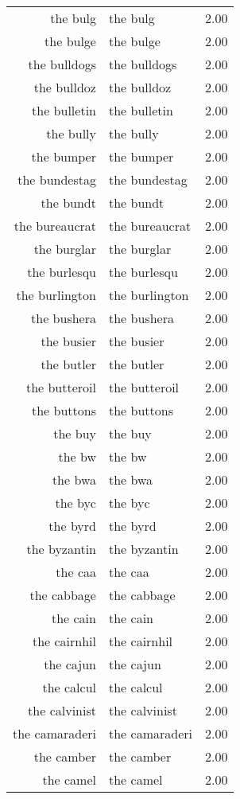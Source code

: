 \begin{table}[ht]
\begin{tabular}{rlr}
  the bulg & the bulg & 2.00 \\ 
  the bulge & the bulge & 2.00 \\ 
  the bulldogs & the bulldogs & 2.00 \\ 
  the bulldoz & the bulldoz & 2.00 \\ 
  the bulletin & the bulletin & 2.00 \\ 
  the bully & the bully & 2.00 \\ 
  the bumper & the bumper & 2.00 \\ 
  the bundestag & the bundestag & 2.00 \\ 
  the bundt & the bundt & 2.00 \\ 
  the bureaucrat & the bureaucrat & 2.00 \\ 
  the burglar & the burglar & 2.00 \\ 
  the burlesqu & the burlesqu & 2.00 \\ 
  the burlington & the burlington & 2.00 \\ 
  the bushera & the bushera & 2.00 \\ 
  the busier & the busier & 2.00 \\ 
  the butler & the butler & 2.00 \\ 
  the butteroil & the butteroil & 2.00 \\ 
  the buttons & the buttons & 2.00 \\ 
  the buy & the buy & 2.00 \\ 
  the bw & the bw & 2.00 \\ 
  the bwa & the bwa & 2.00 \\ 
  the byc & the byc & 2.00 \\ 
  the byrd & the byrd & 2.00 \\ 
  the byzantin & the byzantin & 2.00 \\ 
  the caa & the caa & 2.00 \\ 
  the cabbage & the cabbage & 2.00 \\ 
  the cain & the cain & 2.00 \\ 
  the cairnhil & the cairnhil & 2.00 \\ 
  the cajun & the cajun & 2.00 \\ 
  the calcul & the calcul & 2.00 \\ 
  the calvinist & the calvinist & 2.00 \\ 
  the camaraderi & the camaraderi & 2.00 \\ 
  the camber & the camber & 2.00 \\ 
  the camel & the camel & 2.00 \\ 

\end{tabular}
\end{table}
